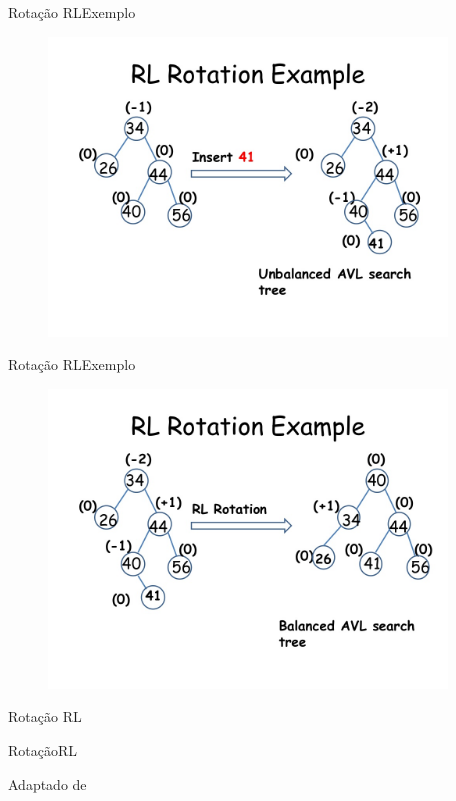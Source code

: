 \documentclass[aspectratio=169]{beamer}
\begin{document}
\begin{frame}{Rotação RL}{Exemplo}
\begin{figure}[!h]
  \centering
  \includegraphics[width=300pt]{imagens/rl_rotation_example.png}
  \label{fig_rl_rotation_example}
\end{figure}
\end{frame}


\begin{frame}{Rotação RL}{Exemplo}
\begin{figure}[!h]
  \centering
  \includegraphics[width=300pt]{imagens/rl_rotation_example1.png}
  \label{fig_rl_rotation_example1}
\end{figure}
\end{frame}



\begin{frame}{Rotação RL}
\begin{algorithm}[H]
\caption{RotaçãoRL} 
\label{RotacaoRL}
\end{algorithm}
\tiny{Adaptado de \cite{Backes2016}}  
\end{frame}
\end{document}
